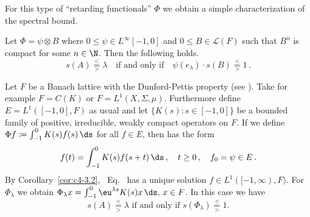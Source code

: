 For this type of \enquote{retarding functionals} $\Phi$ we obtain a simple characterization of the spectral bound.
\begin{corollary*}\label{cor:c4-3.9-kgk}
Let $\Phi = \psi \otimes B$ where $0 \leq \psi \in L^{\infty}[-1,0]$ and $0 \leq B \in \mathcal{L}(F)$ such that $B^{n}$ is compact for some $n \in \N$.
Then the following holds.
\begin{equation}\label{eq:c4-3.10}
s(A) \overset{<}{ \underset{>}{=} } \lambda \quad 
\text{if and only if} 
\quad 
\psi(e_{\lambda}) \cdot s(B) 
\overset{<}{ \underset{>}{=} } 1 \,.
\end{equation}
\end{corollary*}
\begin{example}\label{ex:c4-3.10}
%
Let $F$ be a Banach lattice with the Dunford-Pettis property (see \textcite[Section II.9]{schaefer:1974}).
Take for example $F = C(K)$ or $F = L^{1}(X, \Sigma, \mu)$.
Furthermore define $E = L^{1}([-1,0],F)$ as usual and let $\{K(s) \colon s \in [-1,0]\}$ be a bounded family of positive, irreducible, weakly compact operators on $F$.
If we define $\Phi f \coloneqq \int_{-1}^{0} K(s)f(s) \, \ds$ for all $f \in E$, then 
has the form
\begin{equation}\label{eq:c4-3.11}
f(t) = \int_{-1}^{0} K(s)f(s+t) \, \ds \,, \quad t \geq 0 \,,\quad f_{0} = \psi \in E\,.
\end{equation}
By Corollary~\ref{cor:c4-3.2}, \ Eq.~ has a unique solution $f \in L^{1}([-1,\infty),F)$.
For $\Phi_{\lambda}$ we obtain $\Phi_{\lambda}x = \int_{-1}^{0} \eu^{\lambda s}K(s)x \, \ds,\, x \in F$.
In this case we have 
\[
\text{$s(A) \overset{<}{ \underset{>}{=} } \lambda$  if and only if 
$s(\Phi_{\lambda}) \overset{<}{ \underset{>}{=} } 1$.}
\]
\end{example}

